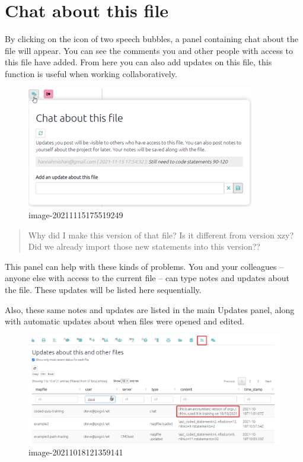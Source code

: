 \documentclass[
]{book}
\begin{document}
\hypertarget{chat-about-this-file}{%
\section{Chat about this file}\label{chat-about-this-file}}

By clicking on the icon of two speech bubbles, a panel containing chat about the file will appear. You can see the comments you and other people with access to this file have added. From here you can also add updates on this file, this function is useful when working collaboratively.

\begin{figure}
\centering
\includegraphics{_assets/image-20211115175519249.png}
\caption{image-20211115175519249}
\end{figure}

\begin{quote}
Why did I make this version of that file? Is it different from version xzy? Did we already import those new statements into this version??
\end{quote}

This panel can help with these kinds of problems. You and your colleagues -- anyone else with access to the current file -- can type notes and updates about the file. These updates will be listed here sequentially.

Also, these same notes and updates are listed in the main Updates panel, along with automatic updates about when files were opened and edited.

\begin{figure}
\centering
\includegraphics{_assets/image-20211018121359141.png}
\caption{image-20211018121359141}
\end{figure}
\end{document}

